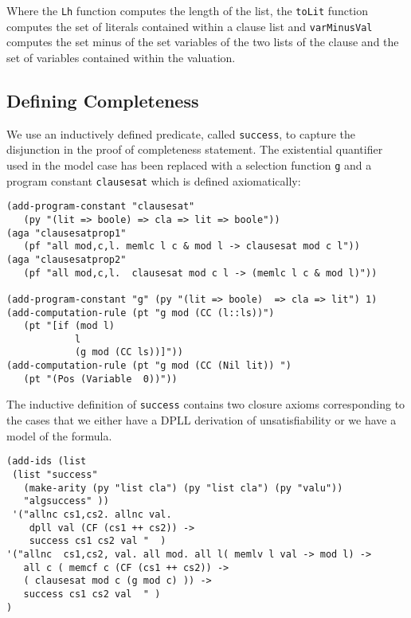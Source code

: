 Where the \texttt{Lh} function computes the length of the list, the \texttt{toLit} function computes the set of literals contained within a clause list and \texttt{varMinusVal} computes the set minus of the set variables of the two lists of the clause and the set of variables contained within the valuation.

\subsection*{Defining Completeness}

We use an inductively defined predicate, called \texttt{success}, to capture the disjunction in the proof of completeness statement. The existential quantifier used in the model case has been replaced with a selection function \texttt{g} and a program constant \texttt{clausesat} which is defined axiomatically:

\begin{lstlisting}
(add-program-constant "clausesat" 
   (py "(lit => boole) => cla => lit => boole"))
(aga "clausesatprop1" 
   (pf "all mod,c,l. memlc l c & mod l -> clausesat mod c l"))
(aga "clausesatprop2" 
   (pf "all mod,c,l.  clausesat mod c l -> (memlc l c & mod l)"))

(add-program-constant "g" (py "(lit => boole)  => cla => lit") 1)
(add-computation-rule (pt "g mod (CC (l::ls))") 
   (pt "[if (mod l)                                                                                       
            l                                                                                     
            (g mod (CC ls))]"))
(add-computation-rule (pt "g mod (CC (Nil lit)) ") 
   (pt "(Pos (Variable  0))"))
\end{lstlisting}

The inductive definition of \texttt{success} contains two closure axioms corresponding to the cases that we either have a DPLL derivation of unsatisfiability or we have a model of the formula. 

\begin{lstlisting}[caption = "Inductive Definition of Completeness"]
(add-ids (list 
 (list "success" 
   (make-arity (py "list cla") (py "list cla") (py "valu"))
   "algsuccess" ))
 '("allnc cs1,cs2. allnc val.                                                                                                                
    dpll val (CF (cs1 ++ cs2)) ->                                                                                        
    success cs1 cs2 val "  )
'("allnc  cs1,cs2, val. all mod. all l( memlv l val -> mod l) ->                                                                      
   all c ( memcf c (CF (cs1 ++ cs2)) ->  
   ( clausesat mod c (g mod c) )) ->                                
   success cs1 cs2 val  " )
)
\end{lstlisting}



